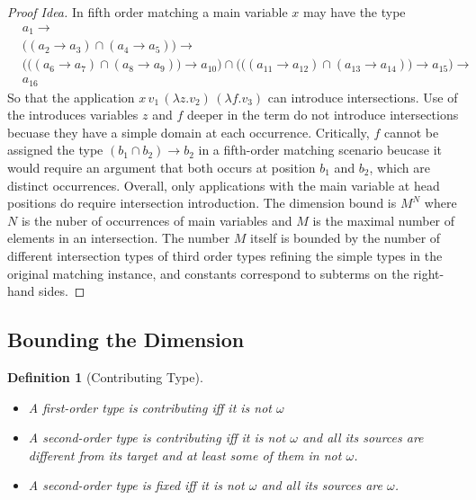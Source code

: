 \documentclass[10pt,a4paper]{article}
\theoremstyle{plain}%
\newtheorem{definition}[theorem]{Definition}
\begin{document}
\begin{proof}[Proof Idea]
In fifth order matching a main variable $x$ may have the type
\begin{align*}
&a_1 \to \\
&\big((a_2 \to a_3) \cap (a_4 \to a_5)\big) \to\\
&\Big(\big((a_6 \to a_7) \cap (a_8 \to a_9)\big) \to a_{10}\Big) \cap \Big(\big((a_{11} \to a_{12}) \cap (a_{13} \to a_{14})\big) \to a_{15}\Big) \to\\
&a_{16}
\end{align*}
So that the application $x\,v_1\,(\lambda z.v_2)\,(\lambda f.v_3)$ can introduce intersections.
Use of the introduces variables $z$ and $f$ deeper in the term do not introduce intersections becuase they have a simple domain at each occurrence.
Critically, $f$ cannot be assigned the type $(b_1 \cap b_2) \to b_2$ in a fifth-order matching scenario beucase it would require an argument that both occurs at position $b_1$ and $b_2$, which are distinct occurrences.
Overall, only applications with the main variable at head positions do require intersection introduction.
The dimension bound is $M^N$ where $N$ is the nuber of occurrences of main variables and $M$ is the maximal number of elements in an intersection. The number $M$ itself is bounded by the number of different intersection types of third order types refining the simple types in the original matching instance, and constants correspond to subterms on the right-hand sides.  
\end{proof}

\newpage

\subsection{Bounding the Dimension}

\begin{definition}[Contributing Type]~
\begin{itemize}
\item A first-order type is contributing iff it is not $\omega$
\item A second-order type is contributing iff it is not $\omega$ and all its sources are different from its target and at least some of them in not $\omega$.
\item A second-order type is fixed iff it is not $\omega$ and all its sources are $\omega$.
\end{itemize}
\end{definition}
\end{document}
